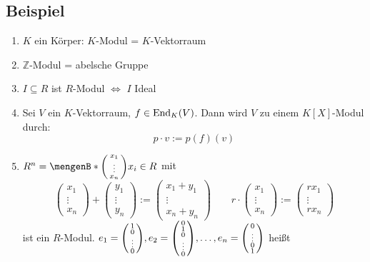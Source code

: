 \subsection[Beispiele verschiedener Module]{Beispiel} %
\label{sub:142}
\begin{enumerate}[(1)]
	\item $K$ ein Körper: $K$-Modul = $K$-Vektorraum
	\item $\mathds{Z}$-Modul = abelsche Gruppe
	\item $I \subseteq R$ ist $R$-Modul $\iff$ $I$ Ideal
	\item Sei $V$ ein $K$-Vektorraum, $f \in \operatorname{End}_K(V)$. Dann wird $V$ zu einem $K[X]$-Modul durch:
	\[
		p \cdot v := p(f)(v)
	\]
	\item $R^n = \set[ \enbrace*{\begin{smallmatrix} x_1 \\ \vdots \\ x_n \end{smallmatrix}}]{x_i \in R} $ mit 
	\[
		\begin{pmatrix}
			x_1 \\ \vdots \\ x_n
		\end{pmatrix} + \begin{pmatrix}
			y_1 \\ \vdots \\ y_n
		\end{pmatrix} := \begin{pmatrix}
			x_1 + y_1 \\ \vdots \\ x_n + y_n
		\end{pmatrix} \qquad r \cdot \begin{pmatrix}
			x_1 \\ \vdots \\ x_n
		\end{pmatrix} := \begin{pmatrix}
			r x_1 \\ \vdots \\ r x_n
		\end{pmatrix}
	\]
	ist ein $R$-Modul. $e_1 = \enbrace*{ \begin{smallmatrix}
		1 \\ 0\\ \vdots \\ 0
	\end{smallmatrix}}, e_2 = \enbrace*{ \begin{smallmatrix}
		0 \\ 1 \\ 0 \\ \vdots \\ 0
	\end{smallmatrix}}, \ldots  , e_n = \enbrace*{\begin{smallmatrix}
		0 \\ \vdots \\ 0 \\ 1
	\end{smallmatrix}}  $ heißt 
\end{enumerate}

